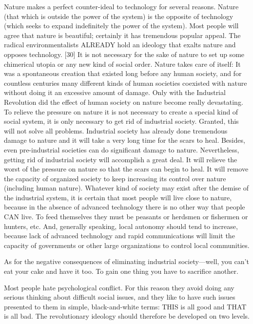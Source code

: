  Nature makes a perfect counter-ideal to technology for several reasons. Nature (that which is outside the power of the system) is the opposite of technology (which seeks to expand indefinitely the power of the system). Most people will agree that nature is beautiful; certainly it has tremendous popular appeal. The radical environmentalists ALREADY hold an ideology that exalts nature and opposes technology. [30] It is not necessary for the sake of nature to set up some chimerical utopia or any new kind of social order. Nature takes care of itself: It was a spontaneous creation that existed long before any human society, and for countless centuries many different kinds of human societies coexisted with nature without doing it an excessive amount of damage. Only with the Industrial Revolution did the effect of human society on nature become really devastating. To relieve the pressure on nature it is not necessary to create a special kind of social system, it is only necessary to get rid of industrial society. Granted, this will not solve all problems. Industrial society has already done tremendous damage to nature and it will take a very long time for the scars to heal. Besides, even pre-industrial societies can do significant damage to nature. Nevertheless, getting rid of industrial society will accomplish a great deal. It will relieve the worst of the pressure on nature so that the scars can begin to heal. It will remove the capacity of organized society to keep increasing its control over nature (including human nature). Whatever kind of society may exist after the demise of the industrial system, it is certain that most people will live close to nature, because in the absence of advanced technology there is no other way that people CAN live. To feed themselves they must be peasants or herdsmen or fishermen or hunters, etc. And, generally speaking, local autonomy should tend to increase, because lack of advanced technology and rapid communications will limit the capacity of governments or other large organizations to control local communities.

 As for the negative consequences of eliminating industrial society—well, you can’t eat your cake and have it too. To gain one thing you have to sacrifice another.

 Most people hate psychological conflict. For this reason they avoid doing any serious thinking about difficult social issues, and they like to have such issues presented to them in simple, black-and-white terms: THIS is all good and THAT is all bad. The revolutionary ideology should therefore be developed on two levels.

